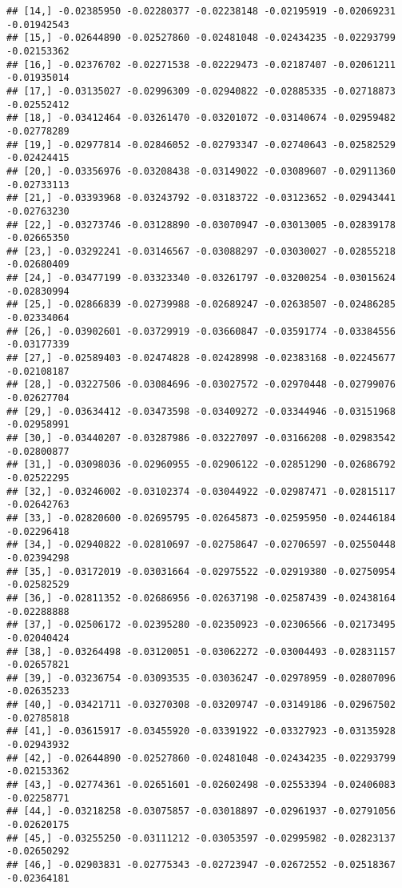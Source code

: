 \documentclass[
]{article}
\begin{document}
\begin{verbatim}
## [14,] -0.02385950 -0.02280377 -0.02238148 -0.02195919 -0.02069231 -0.01942543
## [15,] -0.02644890 -0.02527860 -0.02481048 -0.02434235 -0.02293799 -0.02153362
## [16,] -0.02376702 -0.02271538 -0.02229473 -0.02187407 -0.02061211 -0.01935014
## [17,] -0.03135027 -0.02996309 -0.02940822 -0.02885335 -0.02718873 -0.02552412
## [18,] -0.03412464 -0.03261470 -0.03201072 -0.03140674 -0.02959482 -0.02778289
## [19,] -0.02977814 -0.02846052 -0.02793347 -0.02740643 -0.02582529 -0.02424415
## [20,] -0.03356976 -0.03208438 -0.03149022 -0.03089607 -0.02911360 -0.02733113
## [21,] -0.03393968 -0.03243792 -0.03183722 -0.03123652 -0.02943441 -0.02763230
## [22,] -0.03273746 -0.03128890 -0.03070947 -0.03013005 -0.02839178 -0.02665350
## [23,] -0.03292241 -0.03146567 -0.03088297 -0.03030027 -0.02855218 -0.02680409
## [24,] -0.03477199 -0.03323340 -0.03261797 -0.03200254 -0.03015624 -0.02830994
## [25,] -0.02866839 -0.02739988 -0.02689247 -0.02638507 -0.02486285 -0.02334064
## [26,] -0.03902601 -0.03729919 -0.03660847 -0.03591774 -0.03384556 -0.03177339
## [27,] -0.02589403 -0.02474828 -0.02428998 -0.02383168 -0.02245677 -0.02108187
## [28,] -0.03227506 -0.03084696 -0.03027572 -0.02970448 -0.02799076 -0.02627704
## [29,] -0.03634412 -0.03473598 -0.03409272 -0.03344946 -0.03151968 -0.02958991
## [30,] -0.03440207 -0.03287986 -0.03227097 -0.03166208 -0.02983542 -0.02800877
## [31,] -0.03098036 -0.02960955 -0.02906122 -0.02851290 -0.02686792 -0.02522295
## [32,] -0.03246002 -0.03102374 -0.03044922 -0.02987471 -0.02815117 -0.02642763
## [33,] -0.02820600 -0.02695795 -0.02645873 -0.02595950 -0.02446184 -0.02296418
## [34,] -0.02940822 -0.02810697 -0.02758647 -0.02706597 -0.02550448 -0.02394298
## [35,] -0.03172019 -0.03031664 -0.02975522 -0.02919380 -0.02750954 -0.02582529
## [36,] -0.02811352 -0.02686956 -0.02637198 -0.02587439 -0.02438164 -0.02288888
## [37,] -0.02506172 -0.02395280 -0.02350923 -0.02306566 -0.02173495 -0.02040424
## [38,] -0.03264498 -0.03120051 -0.03062272 -0.03004493 -0.02831157 -0.02657821
## [39,] -0.03236754 -0.03093535 -0.03036247 -0.02978959 -0.02807096 -0.02635233
## [40,] -0.03421711 -0.03270308 -0.03209747 -0.03149186 -0.02967502 -0.02785818
## [41,] -0.03615917 -0.03455920 -0.03391922 -0.03327923 -0.03135928 -0.02943932
## [42,] -0.02644890 -0.02527860 -0.02481048 -0.02434235 -0.02293799 -0.02153362
## [43,] -0.02774361 -0.02651601 -0.02602498 -0.02553394 -0.02406083 -0.02258771
## [44,] -0.03218258 -0.03075857 -0.03018897 -0.02961937 -0.02791056 -0.02620175
## [45,] -0.03255250 -0.03111212 -0.03053597 -0.02995982 -0.02823137 -0.02650292
## [46,] -0.02903831 -0.02775343 -0.02723947 -0.02672552 -0.02518367 -0.02364181

\end{verbatim}
\end{document}
